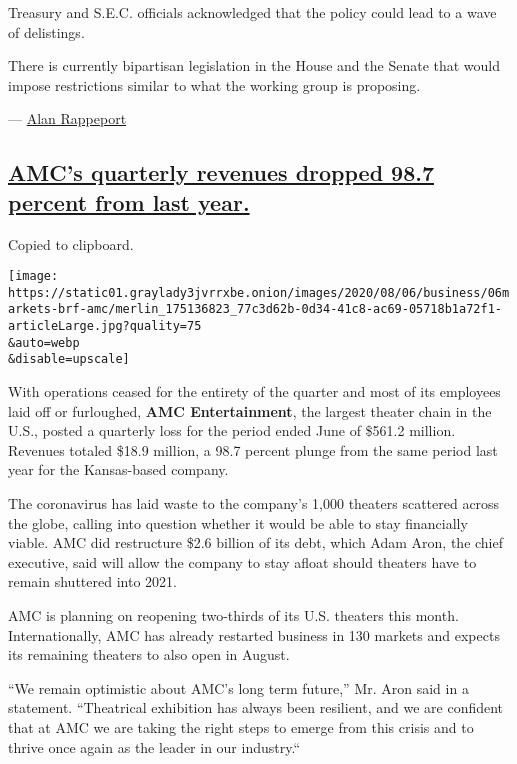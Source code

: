 Treasury and S.E.C. officials acknowledged that the policy could lead to
a wave of delistings.

There is currently bipartisan legislation in the House and the Senate
that would impose restrictions similar to what the working group is
proposing.

--- \href{https://www.nytimes3xbfgragh.onion/by/alan-rappeport}{Alan
Rappeport}

\hypertarget{amcs-quarterly-revenues-dropped-987-percent-from-last-year}{%
\subsection{\texorpdfstring{\protect\hyperlink{amcs-quarterly-revenues-dropped-98-7-percent-from-last-year}{AMC's
quarterly revenues dropped 98.7 percent from last
year.}}{AMC's quarterly revenues dropped 98.7 percent from last year.}}\label{amcs-quarterly-revenues-dropped-987-percent-from-last-year}}

Copied to clipboard.

\texttt{[image: https://static01.graylady3jvrrxbe.onion/images/2020/08/06/business/06markets-brf-amc/merlin\_175136823\_77c3d62b-0d34-41c8-ac69-05718b1a72f1-articleLarge.jpg?quality=75\\\&auto=webp\\\&disable=upscale]}

With operations ceased for the entirety of the quarter and most of its
employees laid off or furloughed, \textbf{AMC Entertainment}, the
largest theater chain in the U.S., posted a quarterly loss for the
period ended June of \$561.2 million. Revenues totaled \$18.9 million, a
98.7 percent plunge from the same period last year for the Kansas-based
company.

The coronavirus has laid waste to the company's 1,000 theaters scattered
across the globe, calling into question whether it would be able to stay
financially viable. AMC did restructure \$2.6 billion of its debt, which
Adam Aron, the chief executive, said will allow the company to stay
afloat should theaters have to remain shuttered into 2021.

AMC is planning on reopening two-thirds of its U.S. theaters this month.
Internationally, AMC has already restarted business in 130 markets and
expects its remaining theaters to also open in August.

``We remain optimistic about AMC's long term future,'' Mr. Aron said in
a statement. ``Theatrical exhibition has always been resilient, and we
are confident that at AMC we are taking the right steps to emerge from
this crisis and to thrive once again as the leader in our industry.``

